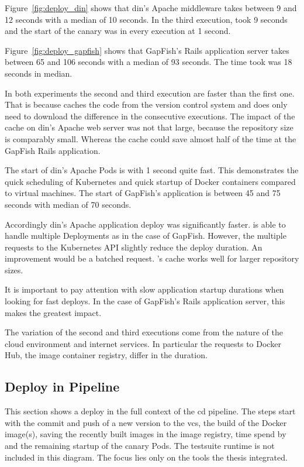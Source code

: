 Figure~\ref{fig:deploy_din} shows that \gls{din}'s Apache middleware takes between 9 and 12
seconds with a median of 10 seconds. In the third execution, \deployer{} took 9 seconds and
the start of the canary was in every execution at 1 second.

Figure~\ref{fig:deploy_gapfish} shows that GapFish's Rails application server takes
between 65 and 106 seconds with a median of 93 seconds. The time \deployer{} took was 18
seconds in median.

In both experiments the second and third execution are faster than the first one. That is
because \deployer{} caches the code from the version control system and does only need to
download the difference in the consecutive executions. The impact of the cache on \gls{din}'s
Apache web server was not that large, because the repository size is comparably
small. Whereas the cache could save almost half of the time at the GapFish Rails
application.

The start of \gls{din}'s Apache Pods is with 1 second quite fast. This demonstrates the quick
scheduling of Kubernetes and quick startup of Docker containers compared to virtual
machines. The start of GapFish's application is between 45 and 75 seconds with median of
70 seconds.

Accordingly \gls{din}'s Apache application deploy was significantly faster. \deployer{} is able to
handle multiple Deployments as in the case of GapFish. However, the multiple requests to the
Kubernetes API slightly reduce the deploy duration. An improvement would be a
batched request. \deployer{}'s cache works well for larger repository sizes.

It is important to pay attention with slow application startup durations when looking for
fast deploys. In the case of GapFish's Rails application server, this makes the
greatest impact.

The variation of the second and third executions come from the nature of the cloud
environment and internet services. In particular the requests to Docker Hub, the image container
registry, differ in the duration.

\subsection{Deploy in Pipeline}

This section shows a deploy in the full context of the \gls{cd} pipeline. The steps start
with the commit and push of a new version to the \gls{vcs}, the build of the
Docker image(s), saving the recently built images in the image registry, time spend by
\deployer{} and the remaining startup of the canary Pods. The testsuite runtime is not
included in this diagram. The focus lies only on the tools the thesis integrated.

